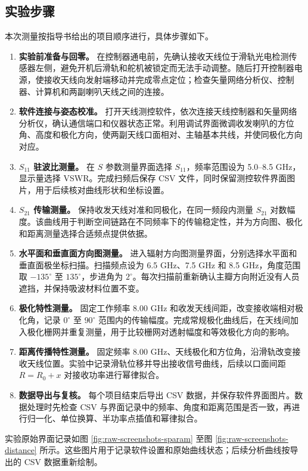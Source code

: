 \documentclass{ctexart}
\begin{document}
\subsection{实验步骤}

本次测量按指导书给出的项目顺序进行，具体步骤如下。

\begin{enumerate}
  \item \textbf{实验前准备与回零。} 在控制器通电前，先确认接收天线位于滑轨光电检测传感器左侧，避免开机后滑轨和舵机被锁定而无法手动调整。随后打开控制器电源，使接收天线向发射端移动并完成零点定位；检查矢量网络分析仪、控制器、计算机和两副喇叭天线之间的连接。
  \item \textbf{软件连接与姿态校准。} 打开天线测控软件，依次连接天线控制器和矢量网络分析仪，确认通信端口和仪器状态正常。利用调试界面微调收发喇叭的方位角、高度和极化方向，使两副天线口面相对、主轴基本共线，并使同极化方向对应。
  \item \textbf{$S_{11}$ 驻波比测量。} 在 $S$ 参数测量界面选择 $S_{11}$，频率范围设为 5.0--8.5 GHz，显示量选择 VSWR。完成扫频后保存 CSV 文件，同时保留测控软件界面图片，用于后续核对曲线形状和坐标设置。
  \item \textbf{$S_{21}$ 传输测量。} 保持收发天线对准和同极化，在同一频段内测量 $S_{21}$ 对数幅度。该曲线用于判断空间链路在不同频率下的传输稳定性，并为方向图、极化和距离测量选择合适频点提供依据。
  \item \textbf{水平面和垂直面方向图测量。} 进入辐射方向图测量界面，分别选择水平面和垂直面极坐标扫描。扫描频点设为 6.5 GHz、7.5 GHz 和 8.5 GHz，角度范围取 $-135^\circ$ 至 $135^\circ$，步进角为 $2^\circ$。每次扫描前重新确认主瓣方向附近没有人员遮挡，并保持吸波材料位置不变。
  \item \textbf{极化特性测量。} 固定工作频率 8.00 GHz 和收发天线间距，改变接收端相对极化角，记录 $0^\circ$ 至 $90^\circ$ 范围内的传输幅度。完成常规极化曲线后，在天线间加入极化栅网并重复测量，用于比较栅网对透射幅度和等效极化方向的影响。
  \item \textbf{距离传播特性测量。} 固定频率 8.00 GHz、天线极化和方位角，沿滑轨改变接收天线位置。实验中记录滑轨位移并导出接收信号曲线，后续以口面间距 $R=R_0+x$ 对接收功率进行幂律拟合。
  \item \textbf{数据导出与复核。} 每个项目结束后导出 CSV 数据，并保存软件界面图片。数据处理时先检查 CSV 与界面记录中的频率、角度和距离范围是否一致，再进行归一化、单位换算、半功率点插值和幂律拟合。
\end{enumerate}

实验原始界面记录如图 \ref{fig:raw-screenshots-sparam} 至图 \ref{fig:raw-screenshots-distance} 所示。这些图片用于记录软件设置和原始曲线状态；后续分析曲线按导出的 CSV 数据重新绘制。
\end{document}
